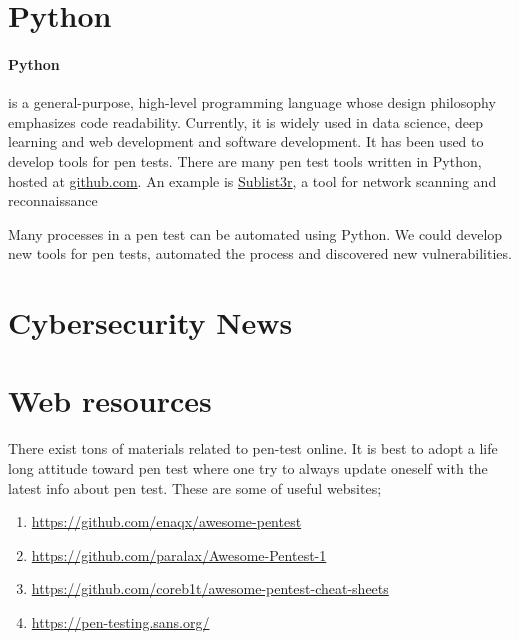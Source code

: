 \documentclass[7x9]{times}
\begin{document}
 

\section{Python}

\paragraph{Python}\cite{van2007python}\cite{lutz2013learning}
\cite{lutz2010programming} is a general-purpose, high-level 
programming language whose design philosophy emphasizes 
code readability. Currently, it is widely used in data 
science, deep learning and web development and software 
development. It has been used to develop tools for pen 
tests.  There are many pen test tools written in Python, 
hosted at \url{github.com}. An example is \url{Sublist3r}, 
a tool for network scanning and reconnaissance 


Many processes in a pen test can be automated using Python.
We could develop new tools for pen tests, automated the
process and discovered new vulnerabilities.


%

\section{Cybersecurity News}

\section{Web resources}

There exist tons of materials related to pen-test online. It
is best to adopt a life long attitude toward pen test where
one try to always update oneself with the latest info about
pen test. These are some of useful websites;
\begin{enumerate}
\item \url{https://github.com/enaqx/awesome-pentest}
\item \url{https://github.com/paralax/Awesome-Pentest-1}
\item \url{https://github.com/coreb1t/awesome-pentest-cheat-sheets}
\item \url{https://pen-testing.sans.org/}
\end{enumerate}
\end{document}
